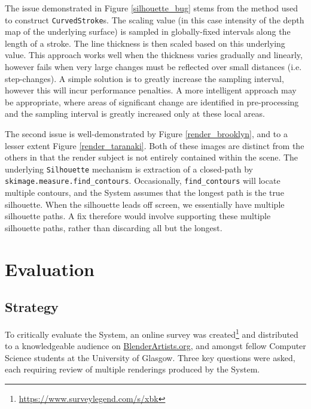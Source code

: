 The issue demonstrated in Figure \ref{silhouette_bug} stems from the method used to construct \texttt{CurvedStroke}s. The scaling value (in this case intensity of the depth map of the underlying surface) is sampled in globally-fixed intervals along the length of a stroke. The line thickness is then scaled based on this underlying value.
This approach works well when the thickness varies gradually and linearly, however fails when very large changes must be reflected over small distances (i.e. step-changes).
A simple solution is to greatly increase the sampling interval, however this will incur performance penalties.
A more intelligent approach may be appropriate, where areas of significant change are identified in pre-processing and the sampling interval is greatly increased only at these local areas.

The second issue is well-demonstrated by Figure \ref{render_brooklyn}, and to a lesser extent Figure \ref{render_taranaki}.
Both of these images are distinct from the others in that the render subject is not entirely contained within the scene.
The underlying \texttt{Silhouette} mechanism is extraction of a closed-path by \texttt{skimage.measure.find\_contours}.
Occasionally, \texttt{find\_contours} will locate multiple contours, and the System assumes that the longest path is the true silhouette.
When the silhouette leads off screen, we essentially have multiple silhouette paths.
A fix therefore would involve supporting these multiple silhouette paths, rather than discarding all but the longest.

\section{Evaluation}

\subsection{Strategy}

To critically evaluate the System, an online survey was created\footnote{\url{https://www.surveylegend.com/s/xbk}} and distributed to a knowledgeable audience on \url{BlenderArtists.org}, and amongst fellow Computer Science students at the University of Glasgow.
Three key questions were asked, each requiring review of multiple renderings produced by the System.

